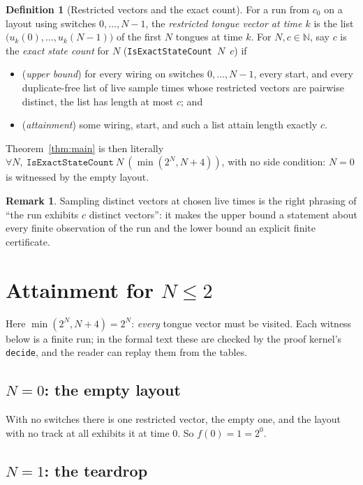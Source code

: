\documentclass[11pt]{article}
\theoremstyle{definition}
\newtheorem{definition}[theorem]{Definition}
\newtheorem{remark}[theorem]{Remark}
\newcommand{\lean}[1]{\texttt{#1}}
\begin{document}
\begin{definition}[Restricted vectors and the exact count]
  For a run from $c_0$ on a layout using switches $0,\dots,N-1$, the
  \emph{restricted tongue vector at time $k$} is the list
  $\bigl(u_k(0),\dots,u_k(N{-}1)\bigr)$ of the first $N$ tongues at time
  $k$.  For $N, c \in \mathbb{N}$, say $c$ is the \emph{exact state
  count} for $N$ (\lean{IsExactStateCount}~$N$~$c$) if
  \begin{itemize}
  \item (\emph{upper bound}) for every wiring on switches $0,\dots,N-1$,
    every start, and every duplicate-free list of live sample times whose
    restricted vectors are pairwise distinct, the list has length at most
    $c$; and
  \item (\emph{attainment}) some wiring, start, and such a list attain
    length exactly $c$.
  \end{itemize}
\end{definition}

Theorem~\ref{thm:main} is then literally
$\forall N,\ \lean{IsExactStateCount}\ N\ (\min(2^N, N+4))$, with no side
condition: $N = 0$ is witnessed by the empty layout.

\begin{remark}
  Sampling distinct vectors at chosen live times is the right phrasing of
  ``the run exhibits $c$ distinct vectors'': it makes the upper bound a
  statement about every finite observation of the run and the lower bound
  an explicit finite certificate.
\end{remark}

\section{Attainment for $N \le 2$}\label{sec:small}

Here $\min(2^N, N+4) = 2^N$: \emph{every} tongue vector must be visited.
Each witness below is a finite run; in the formal text these are checked
by the proof kernel's \lean{decide}, and the reader can replay them from
the tables.

\subsection{$N = 0$: the empty layout}
With no switches there is one restricted vector, the empty one, and the
layout with no track at all exhibits it at time $0$.  So $f(0) = 1 = 2^0$.

\subsection{$N = 1$: the teardrop}
\end{document}
